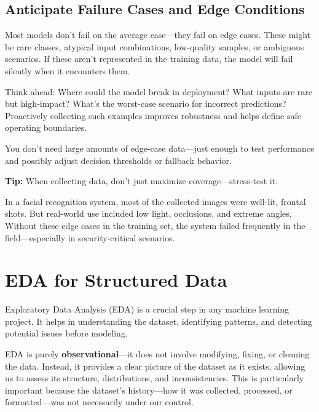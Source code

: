 \documentclass[12pt,openany]{book}
\begin{document}
\section{Anticipate Failure Cases and Edge Conditions}

Most models don't fail on the average case—they fail on edge cases. These might be rare classes, atypical input combinations, low-quality samples, or ambiguous scenarios. If these aren't represented in the training data, the model will fail silently when it encounters them.

Think ahead: Where could the model break in deployment? What inputs are rare but high-impact? What’s the worst-case scenario for incorrect predictions? Proactively collecting such examples improves robustness and helps define safe operating boundaries.

You don’t need large amounts of edge-case data—just enough to test performance and possibly adjust decision thresholds or fallback behavior.

\textbf{Tip:} When collecting data, don’t just maximize coverage—stress-test it.

\begin{examplebox}
In a facial recognition system, most of the collected images were well-lit, frontal shots. But real-world use included low light, occlusions, and extreme angles. Without these edge cases in the training set, the system failed frequently in the field—especially in security-critical scenarios.
\end{examplebox}




\chapter{EDA for Structured Data}

Exploratory Data Analysis (EDA) is a crucial step in any machine learning 
project. It helps in understanding the dataset, identifying patterns, and 
detecting potential issues before modeling. \newline

EDA is purely \textbf{observational}—it does not involve modifying, fixing, 
or cleaning the data. Instead, it provides a clear picture of the dataset 
as it exists, allowing us to assess its structure, distributions, and 
inconsistencies. This is particularly important because the dataset’s 
history—how it was collected, processed, or formatted—was not necessarily 
under our control. \newline
\end{document}
